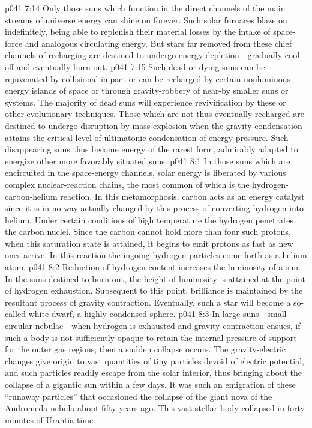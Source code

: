 \pc \vs p041 7:14 Only those suns which function in the direct channels of the main streams of universe energy can shine on forever. Such solar furnaces blaze on indefinitely, being able to replenish their material losses by the intake of space\hyp{}force and analogous circulating energy. But stars far removed from these chief channels of recharging are destined to undergo energy depletion---gradually cool off and eventually burn out.
\vs p041 7:15 Such dead or dying suns can be rejuvenated by collisional impact or can be recharged by certain nonluminous energy islands of space or through gravity\hyp{}robbery of near\hyp{}by smaller suns or systems. The majority of dead suns will experience revivification by these or other evolutionary techniques. Those which are not thus eventually recharged are destined to undergo disruption by mass explosion when the gravity condensation attains the critical level of ultimatonic condensation of energy pressure. Such disappearing suns thus become energy of the rarest form, admirably adapted to energize other more favorably situated suns.
\vs p041 8:1 In those suns which are encircuited in the space\hyp{}energy channels, solar energy is liberated by various complex nuclear\hyp{}reaction chains, the most common of which is the hydrogen\hyp{}carbon\hyp{}helium reaction. In this metamorphosis, carbon acts as an energy catalyst since it is in no way actually changed by this process of converting hydrogen into helium. Under certain conditions of high temperature the hydrogen penetrates the carbon nuclei. Since the carbon cannot hold more than four such protons, when this saturation state is attained, it begins to emit protons as fast as new ones arrive. In this reaction the ingoing hydrogen particles come forth as a helium atom.
\pc \vs p041 8:2 Reduction of hydrogen content increases the luminosity of a sun. In the suns destined to burn out, the height of luminosity is attained at the point of hydrogen exhaustion. Subsequent to this point, brilliance is maintained by the resultant process of gravity contraction. Eventually, such a star will become a so\hyp{}called white dwarf, a highly condensed sphere.
\pc \vs p041 8:3 In large suns---small circular nebulae---when hydrogen is exhausted and gravity contraction ensues, if such a body is not sufficiently opaque to retain the internal pressure of support for the outer gas regions, then a sudden collapse occurs. The gravity\hyp{}electric changes give origin to vast quantities of tiny particles devoid of electric potential, and such particles readily escape from the solar interior, thus bringing about the collapse of a gigantic sun within a few days. It was such an emigration of these “runaway particles” that occasioned the collapse of the giant nova of the Andromeda nebula about fifty years ago. This vast stellar body collapsed in forty minutes of Urantia time.

